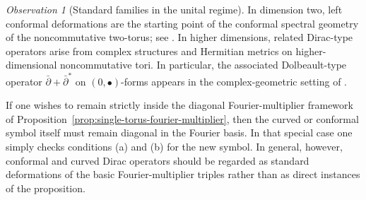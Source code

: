 \documentclass[11pt]{amsart}
\theoremstyle{definition}
\theoremstyle{remark}
\newtheorem{observation}[theorem]{Observation}
\begin{document}
\begin{observation}[Standard families in the unital regime]
In dimension two, left conformal deformations are the starting point of the
conformal spectral geometry of the noncommutative two-torus; see
\cite{ConnesTretkoff,FathizadehKhalkhaliScalar}. In higher dimensions, related
Dirac-type operators arise from complex structures and Hermitian metrics on
higher-dimensional noncommutative tori. In particular, the associated
Dolbeault-type operator $\bar\partial+\bar\partial^*$
on $(0,\bullet)$-forms appears in the complex-geometric setting of
\cite{MathaiRosenberg2}.

If one wishes to remain strictly inside the diagonal Fourier-multiplier
framework of Proposition~\ref{prop:single-torus-fourier-multiplier}, then the
curved or conformal symbol itself must remain diagonal in the Fourier basis. In
that special case one simply checks conditions \textup{(a)} and \textup{(b)}
for the new symbol. In general, however, conformal and curved Dirac operators
should be regarded as standard deformations of the basic Fourier-multiplier
triples rather than as direct instances of the proposition.

\end{observation}
\end{document}

